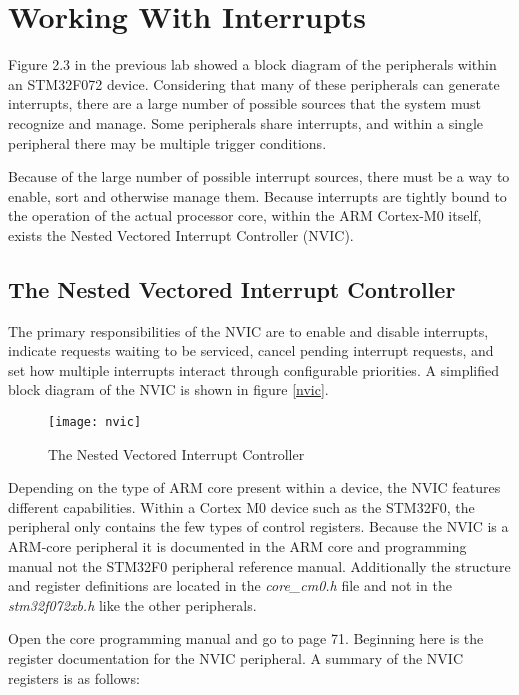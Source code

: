 \documentclass[11pt,fleqn]{book} %
\begin{document}
\section{Working With Interrupts}
Figure 2.3 in the previous lab showed a block diagram of the peripherals within an STM32F072 device. Considering that many of these peripherals can generate interrupts, there are a large number of possible sources that the system must recognize and manage. Some peripherals share interrupts, and within a single peripheral there may be multiple trigger conditions.  

Because of the large number of possible interrupt sources, there must be a way to enable, sort and otherwise manage them. Because interrupts are tightly bound to the operation of the actual processor core, within the ARM Cortex-M0 itself, exists the Nested Vectored Interrupt Controller (NVIC).

\subsection{The Nested Vectored Interrupt Controller}
The primary responsibilities of the NVIC are to enable and disable interrupts, indicate requests waiting to be serviced, cancel pending interrupt requests, and set how multiple interrupts interact through configurable priorities. A simplified block diagram of the NVIC is shown in figure \vref{nvic}.
    
\begin{figure}[h]
    \centering\texttt{[image: nvic]}
    \caption{The Nested Vectored Interrupt Controller}
    \label{nvic}
\end{figure}

Depending on the type of ARM core present within a device, the NVIC features different capabilities. Within a Cortex M0 device such as the STM32F0, the peripheral only contains the few types of control registers. Because the NVIC is a ARM-core peripheral it is documented in the ARM core and programming manual not the STM32F0 peripheral reference manual. Additionally the structure and register definitions are located in the \textit{core\_cm0.h} file and not in the \textit{stm32f072xb.h} like the other peripherals.  

Open the core programming manual and go to page 71. Beginning here is the register documentation for the NVIC peripheral. A summary of the NVIC registers is as follows:
\end{document}
